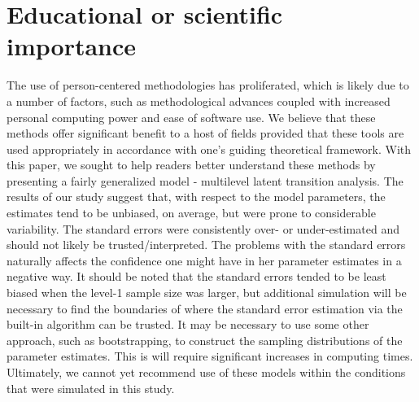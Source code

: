 \documentclass[man, noextraspace, floatsintext, 12pt]{apa7}
\begin{document}
\section*{Educational or scientific importance }
The use of person-centered methodologies has proliferated, which is likely due to a number of factors, such as methodological advances coupled with increased personal computing power and ease of software use. We believe that these methods offer significant benefit to a host of fields provided that these tools are used appropriately in accordance with one's guiding theoretical framework. With this paper, we sought to help readers better understand these methods by presenting a fairly generalized model - multilevel latent transition analysis. The results of our study suggest that, with respect to the model parameters, the estimates tend to be unbiased, on average, but were prone to considerable variability. The standard errors were consistently over- or under-estimated and should not likely be trusted/interpreted. The problems with the standard errors naturally affects the confidence one might have in her parameter estimates in a negative way. It should be noted that the standard errors tended to be least biased when the level-1 sample size was larger, but additional simulation will be necessary to find the boundaries of where the standard error estimation via the built-in algorithm can be trusted. It may be necessary to use some other approach, such as bootstrapping, to construct the sampling distributions of the parameter estimates. This is will require significant increases in computing times. Ultimately, we cannot yet recommend use of these models within the conditions that were simulated in this study.

\newpage
\raggedright
% 
%
\printbibliography
\appendix
\end{document}

